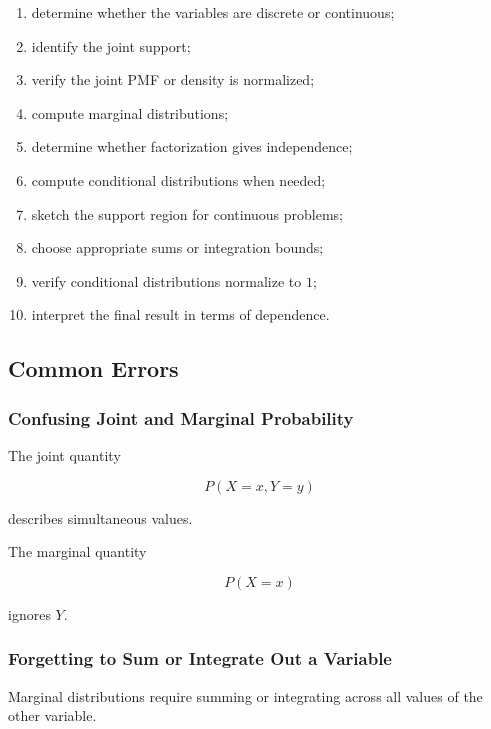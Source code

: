 \begin{enumerate}
    \item determine whether the variables are discrete or continuous;
    \item identify the joint support;
    \item verify the joint PMF or density is normalized;
    \item compute marginal distributions;
    \item determine whether factorization gives independence;
    \item compute conditional distributions when needed;
    \item sketch the support region for continuous problems;
    \item choose appropriate sums or integration bounds;
    \item verify conditional distributions normalize to \(1\);
    \item interpret the final result in terms of dependence.
\end{enumerate}

\subsection{Common Errors}
\label{subsec:joint-distributions-common-errors}

\subsubsection{Confusing Joint and Marginal Probability}

The joint quantity

\[
P(X=x,Y=y)
\]

describes simultaneous values.

The marginal quantity

\[
P(X=x)
\]

ignores \(Y\).

\subsubsection{Forgetting to Sum or Integrate Out a Variable}

Marginal distributions require summing or integrating across all values
of the other variable.

